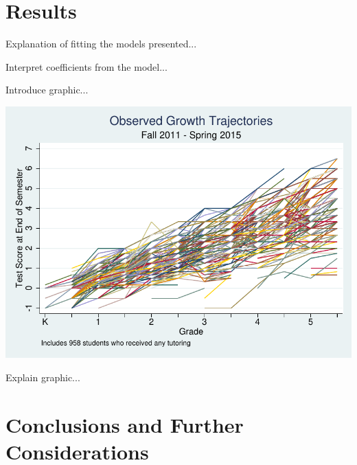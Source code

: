 \documentclass[a0,landscape]{a0poster}
\begin{document}
\begin{multicols}{3}
\color{NavyBlue}

\section*{Results}

Explanation of fitting the models presented...
%
\color{Black}
\begin{center}\vspace{1cm}

\end{center}\vspace{1cm}
\color{NavyBlue}
%   

Interpret coefficients from the model...

\color{NavyBlue}

Introduce graphic...

\begin{center}\vspace{1cm}
\includegraphics[width=0.8\linewidth]{xtline.pdf}
\end{center}\vspace{1cm}

Explain graphic...


\color{SaddleBrown} %

\section*{Conclusions and Further Considerations}


\end{multicols}
\end{document}
